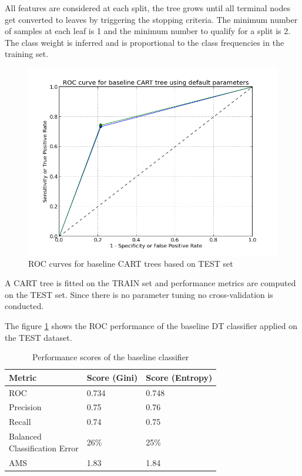 \documentclass[final,3p,times,twocolumn]{elsarticle}
\begin{document}
All features are considered at each split, the tree grows until all terminal nodes get converted to leaves by triggering the stopping criteria. The minimum number of samples at each leaf is 1 and the minimum number to qualify for a split is 2. The class weight is inferred and is proportional to the class frequencies in the training set.

\begin{figure}
\hspace{-1.5cm}
\includegraphics[scale=0.5]{Images/baseline_DT_ROC.png}
\caption{ROC curves for baseline CART trees based on TEST set}
\label{base_roc}
\end{figure}

A CART tree is fitted on the TRAIN set and performance metrics are computed on the TEST set. Since there is no parameter tuning no cross-validation is conducted.

The figure \ref{base_roc} shows the ROC performance of the baseline DT classifier applied on the TEST dataset. 

\begin{table}
\centering
\begin{tabular}{l|l|l}
Metric & Score (Gini) & Score (Entropy)\\
\toprule
ROC & 0.734 & 0.748\\
Precision & 0.75 & 0.76 \\
Recall & 0.74 & 0.75\\
\pbox{10cm}{Balanced \\Classification Error} & 26\% & 25\%\\
AMS &  1.83 & 1.84\\
\end{tabular}
\caption{Performance scores of the baseline classifier}
\end{table}
\end{document}
